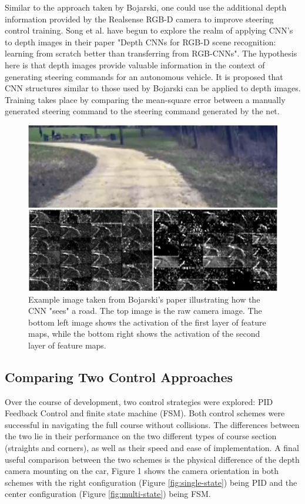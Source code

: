 \documentclass[letterpaper, 10 pt, conference]{ieeeconf}  %
\begin{document}
Similar to the approach taken by Bojarski, one could use the additional depth information provided by the Realsense RGB-D camera to improve steering control training. Song et al. have begun to explore the realm of applying CNN's to depth images in their paper "Depth CNNs for RGB-D scene recognition: learning from scratch better than transferring from RGB-CNNs"\cite{huang}. The hypothesis here is that depth images provide valuable information in the context of generating steering commands for an autonomous vehicle. It is proposed that CNN structures similar to those used by Bojarski can be applied to depth images. Training takes place by comparing the mean-square error between a manually generated steering command to the steering command generated by the net. 
\begin{figure}[h!]
\begin{center}
\includegraphics[width=.44\textwidth]{Figures/cnn.png}
\caption{Example image taken from Bojarski's paper illustrating how the CNN "sees" a road. The top image is the raw camera image. The bottom left image shows the activation of the first layer of feature maps, while the bottom right shows the activation of the second layer of feature maps.}
\label{cnn}
\end{center}
\end{figure}

\newpage
\subsection{Comparing Two Control Approaches} \label{crtlAppendix}

Over the course of development, two control strategies were explored: PID Feedback Control and finite state machine (FSM).  Both control schemes were successful in navigating the full course without collisions. The differences between the two lie in their performance on the two different types of course section (straights and corners), as well as their speed and ease of implementation. A final useful comparison between the two schemes is the physical difference of the depth camera mounting on the car, Figure 1 shows the camera orientation in both schemes with the right configuration (Figure \ref{fig:single-state}) being PID and the center configuration (Figure \ref{fig:multi-state}) being FSM.
\end{document}
